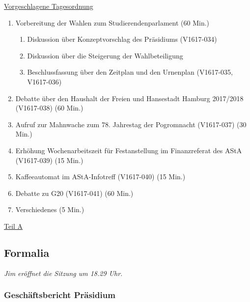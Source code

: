 \documentclass[ngerman,headheight=70pt]{scrartcl}
\begin{document}
    \newpage
    \underline{Vorgeschlagene Tagesordnung}
    \begin{enumerate}[label={\textbf{Top \theenumi}},leftmargin=*]
        \item Vorbereitung der Wahlen zum Studierendenparlament (60 Min.)
        \begin{enumerate}
            \item Diskussion über Konzeptvorschlag des Präsidiums (V1617-034)
            \item Diskussion über die Steigerung der Wahlbeteiligung
            \item Beschlussfassung über den Zeitplan und den Urnenplan
            (V1617-035, V1617-036)
        \end{enumerate}
        \item Debatte über den Haushalt der Freien und Hansestadt Hamburg
              2017/2018 (V1617-038) (60 Min.)
        \item Aufruf zur Mahnwache zum 78. Jahrestag der Pogromnacht (V1617-037) (30 Min.)
        \item Erhöhung Wochenarbeitszeit für Festanstellung im Finanzreferat des AStA (V1617-039) (15 Min.)
        \item Kaffeeautomat im AStA-Infotreff (V1617-040) (15 Min.)
        \item Debatte zu G20 (V1617-041) (60 Min.)
        \item Verschiedenes (5 Min.)
    \end{enumerate}

    \newpage


    {\Large \underline{Teil A}}

    \subsection{Formalia}

    \textit{Jim eröffnet die Sitzung um 18.29 Uhr.}

    \subsubsection{Geschäftsbericht Präsidium}
\end{document}
